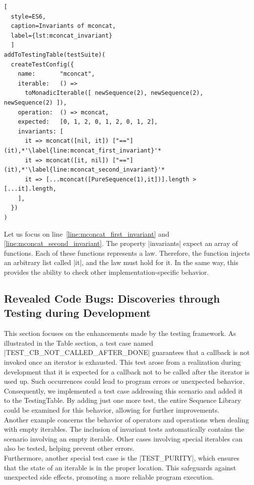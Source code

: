 \begin{lstlisting}[
  style=ES6, 
  caption=Invariants of mconcat,
  label={lst:mconcat_invariant}
  ]
addToTestingTable(testSuite)(
  createTestConfig({
    name:       "mconcat",
    iterable:   () => 
      toMonadicIterable([ newSequence(2), newSequence(2), newSequence(2) ]),
    operation:  () => mconcat,
    expected:   [0, 1, 2, 0, 1, 2, 0, 1, 2],
    invariants: [
      it => mconcat([nil, it]) ["=="] (it),*'\label{line:mconcat_first_invariant}'*
      it => mconcat([it, nil]) ["=="] (it),*'\label{line:mconcat_second_invariant}'*
      it => [...mconcat([PureSequence(1),it])].length > [...it].length,
    ],
  })
)
\end{lstlisting}

Let us focus on line~\ref{line:mconcat_first_invariant} and 
\ref{line:mconcat_second_invariant}.
The property |invariants| expect an array of functions. Each of these
functions represents a law. Therefore, the function injects an arbitrary list
called |it|, and the law must hold for it. In the same way, this provides the
ability to check other implementation-specific behavior.

\subsection{Revealed Code Bugs: Discoveries through Testing during Development}
\label{sub:Revealed Code Bugs: Discoveries through Testing during Development}
This section focuses on the enhancements made by the testing framework. As
illustrated in the Table section, a test case named |TEST_CB_NOT_CALLED_AFTER_DONE|
guarantees that a callback is not invoked once an iterator is exhausted. This
test arose from a realization during development that it is expected for a
callback not to be called after the iterator is used up. Such occurrences could
lead to program errors or unexpected behavior. Consequently, we implemented a
test case addressing this scenario and added it to the TestingTable. By adding
just one more test, the entire Sequence Library could be examined for this
behavior, allowing for further improvements.
\\
Another example concerns the behavior of operators and operations when dealing
with empty iterables. The inclusion of invariant tests automatically contains the
scenario involving an empty iterable. Other cases involving special iterables
can also be tested, helping prevent other errors.
\\
Furthermore, another special test case is the |TEST_PURITY|, which ensures that
the state of an iterable is in the proper location. This safeguards against
unexpected side effects, promoting a more reliable program execution.

